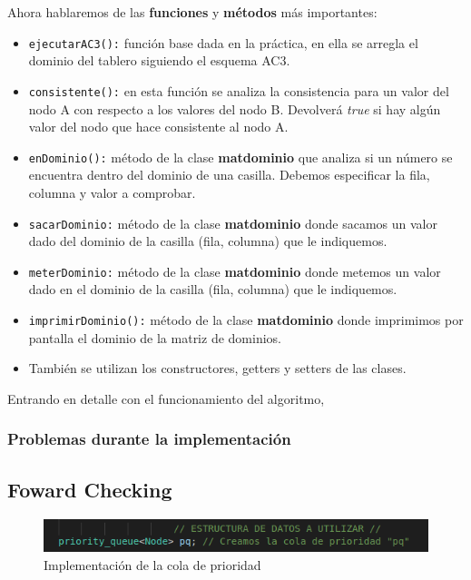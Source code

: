 \documentclass[12pt]{article}
\begin{document}
Ahora hablaremos de las \textbf{funciones} y \textbf{métodos} más importantes:

\begin{itemize}
    \item \verb|ejecutarAC3():| función base dada en la práctica, en ella se arregla el dominio
        del tablero siguiendo el esquema AC3.
    \item \verb|consistente():| en esta función se analiza la consistencia para un valor del nodo A
    con respecto a los valores del nodo B. Devolverá \textit{true} si hay algún valor del nodo que hace consistente al nodo A.
    
    \item \verb|enDominio():| método de la clase \textbf{matdominio} que analiza si un número se encuentra dentro del dominio
    de una casilla. Debemos especificar la fila, columna y valor a comprobar.

    \item \verb|sacarDominio:| método de la clase \textbf{matdominio} donde sacamos un valor dado del dominio de 
    la casilla (fila, columna) que le indiquemos.
    \item \verb|meterDominio:| método de la clase \textbf{matdominio} donde metemos un valor dado en el dominio de 
    la casilla (fila, columna) que le indiquemos.

    \item \verb|imprimirDominio():| método de la clase \textbf{matdominio} donde imprimimos por pantalla el dominio de la matriz de 
    dominios.
    
    \item También se utilizan los constructores, getters y setters de las clases.

\end{itemize}

Entrando en detalle con el funcionamiento del algoritmo, 



\verb||
\textbf{}
\textit{}

\subsubsection{Problemas durante la implementación}
\subsection{Foward Checking}
\begin{figure}[h]
    \centering
    \includegraphics[scale=0.5]{cola_de_prior.png}
    \caption{Implementación de la cola de prioridad}
    \label{fig:colprior}
\end{figure}

\section{}
\end{document}

